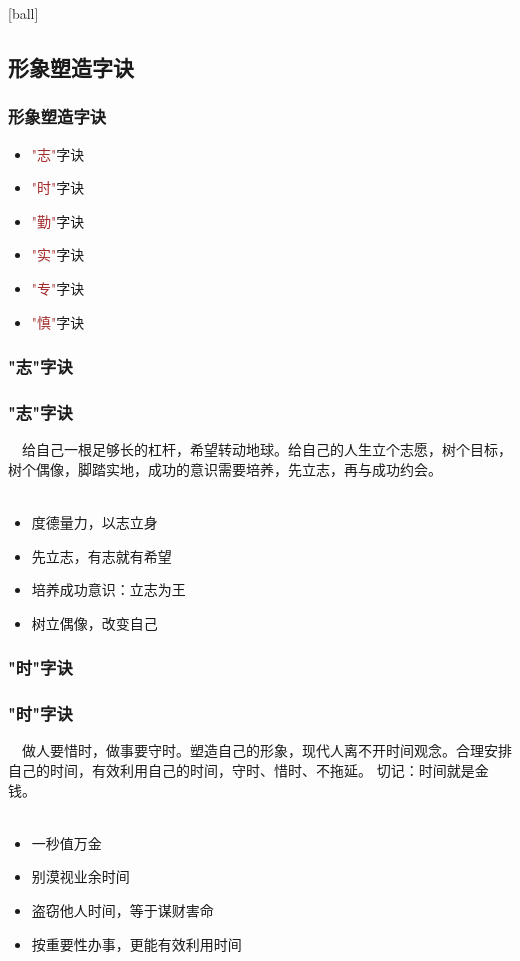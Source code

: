 [ball]

\subsection{形象塑造字诀}
\begin{frame}
\frametitle{形象塑造字诀}
\begin{itemize}
    \item \textcolor{brown}{"志"}字诀
    \item \textcolor{brown}{"时"}字诀
    \item \textcolor{brown}{"勤"}字诀
    \item \textcolor{brown}{"实"}字诀
    \item \textcolor{brown}{"专"}字诀
    \item \textcolor{brown}{"慎"}字诀
\end{itemize}
\end{frame}


\subsubsection{"志"字诀}
\begin{frame}
\frametitle{"志"字诀}
\noindent\handr~~给自己一根足够长的杠杆，希望转动地球。给自己的人生立个志愿，树个目标，树个偶像，脚踏实地，成功的意识需要培养，先立志，再与成功约会。
~\\
~\\
\begin{itemize}
    \item 度德量力，以志立身
    \item 先立志，有志就有希望
    \item 培养成功意识：立志为王
    \item 树立偶像，改变自己
\end{itemize}
\end{frame}

\subsubsection{"时"字诀}
\begin{frame}
\frametitle{"时"字诀}
\noindent\handr~~做人要惜时，做事要守时。塑造自己的形象，现代人离不开时间观念。合理安排自己的时间，有效利用自己的时间，守时、惜时、不拖延。 切记：时间就是金钱。
~\\
~\\
\begin{itemize}
    \item 一秒值万金
    \item 别漠视业余时间
    \item 盗窃他人时间，等于谋财害命
    \item 按重要性办事，更能有效利用时间
\end{itemize}
\end{frame}


